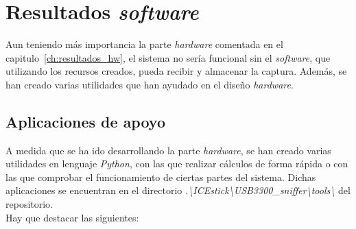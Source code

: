 \chapter{Resultados \emph{software}}
\label{ch:resultados_sw}

Aun teniendo más importancia la parte \emph{hardware} comentada en el capitulo~\ref{ch:resultados_hw}, el sistema no sería funcional sin el \emph{software}, que utilizando los recursos creados, pueda recibir y almacenar la captura. Además, se han creado varias utilidades que han ayudado en el diseño \emph{hardware}.

\section{Aplicaciones de apoyo}
A medida que se ha ido desarrollando la parte \emph{hardware}, se han creado varias utilidades en lenguaje \emph{Python}, con las que realizar cálculos de forma rápida o con las que comprobar el funcionamiento de ciertas partes del sistema. Dichas aplicaciones se encuentran en el directorio \emph{.\textbackslash ICEstick\textbackslash USB3300\_sniffer\textbackslash tools\textbackslash} del repositorio. \\
Hay que destacar las siguientes:
